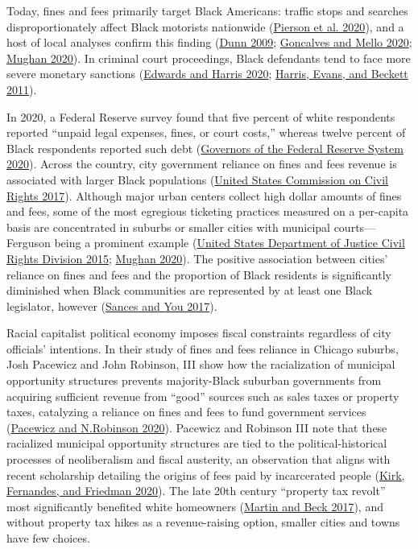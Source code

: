 \documentclass[
  12pt,
]{article}
\begin{document}
Today, fines and fees primarily target Black Americans: traffic stops and searches disproportionately affect Black motorists nationwide (\protect\hyperlink{ref-Pierson2020}{Pierson et al. 2020}), and a host of local analyses confirm this finding (\protect\hyperlink{ref-Dunn2009}{Dunn 2009}; \protect\hyperlink{ref-Goncalves2020}{Goncalves and Mello 2020}; \protect\hyperlink{ref-Mughan2020}{Mughan 2020}). In criminal court proceedings, Black defendants tend to face more severe monetary sanctions (\protect\hyperlink{ref-Edwards2020}{Edwards and Harris 2020}; \protect\hyperlink{ref-Harris2011}{Harris, Evans, and Beckett 2011}).

In 2020, a Federal Reserve survey found that five percent of white respondents reported ``unpaid legal expenses, fines, or court costs,'' whereas twelve percent of Black respondents reported such debt (\protect\hyperlink{ref-BoardofGovernorsoftheFederalReserveSystem2020}{Governors of the Federal Reserve System 2020}). Across the country, city government reliance on fines and fees revenue is associated with larger Black populations (\protect\hyperlink{ref-UnitedStatesCommissiononCivilRights2017}{United States Commission on Civil Rights 2017}). Although major urban centers collect high dollar amounts of fines and fees, some of the most egregious ticketing practices measured on a per-capita basis are concentrated in suburbs or smaller cities with municipal courts---Ferguson being a prominent example (\protect\hyperlink{ref-UnitedStatesDepartmentofJusticeCivilRightsDivision2015}{United States Department of Justice Civil Rights Division 2015}; \protect\hyperlink{ref-Mughan2020}{Mughan 2020}). The positive association between cities' reliance on fines and fees and the proportion of Black residents is significantly diminished when Black communities are represented by at least one Black legislator, however (\protect\hyperlink{ref-Sances2017}{Sances and You 2017}).

Racial capitalist political economy imposes fiscal constraints regardless of city officials' intentions. In their study of fines and fees reliance in Chicago suburbs, Josh Pacewicz and John Robinson, III show how the racialization of municipal opportunity structures prevents majority-Black suburban governments from acquiring sufficient revenue from ``good'' sources such as sales taxes or property taxes, catalyzing a reliance on fines and fees to fund government services (\protect\hyperlink{ref-Pacewicz2020}{Pacewicz and N.Robinson 2020}). Pacewicz and Robinson III note that these racialized municipal opportunity structures are tied to the political-historical processes of neoliberalism and fiscal austerity, an observation that aligns with recent scholarship detailing the origins of fees paid by incarcerated people (\protect\hyperlink{ref-Kirk2020}{Kirk, Fernandes, and Friedman 2020}). The late 20th century ``property tax revolt'' most significantly benefited white homeowners (\protect\hyperlink{ref-Martin2017}{Martin and Beck 2017}), and without property tax hikes as a revenue-raising option, smaller cities and towns have few choices.
\end{document}
